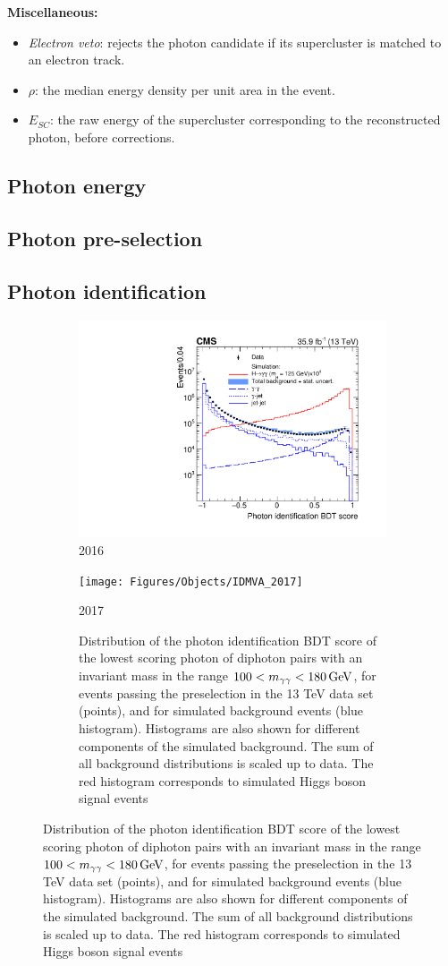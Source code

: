 \textbf{Miscellaneous:}
\begin{itemize}[noitemsep]
\item \emph{Electron veto}: rejects the photon candidate if its 
         supercluster is matched to an electron track.
\item \emph{$\rho$}: the median energy  density per unit area in the event.
\item \emph{$E_{SC}$}: the raw energy of the supercluster
  corresponding to the reconstructed photon, before corrections.
\end{itemize}

\subsection{Photon energy}
\subsection{Photon pre-selection}
\subsection{Photon identification}

\begin{figure}[h!]
  \centering
  \begin{subfigure}{0.45\textwidth}
    \includegraphics[width=\textwidth]{Figures/Objects/IDMVA_2016}
    \caption{2016}
    \label{fig:obj_IDMVA_2016}
  \end{subfigure}
  \begin{subfigure}{0.45\textwidth}
    \texttt{[image: Figures/Objects/IDMVA\_2017]}
    \caption{2017}
    \label{fig:obj_IDMVA_2016}
  \caption{Distribution of the photon identification BDT score of the lowest scoring photon
  of diphoton pairs with an invariant mass in the range $100 < m_{\gamma\gamma} < \SI{180}{GeV}$, for events passing
  the preselection in the 13 TeV data set (points), and for simulated background events (blue
  histogram). Histograms are also shown for different components of the simulated background.
  The sum of all background distributions is scaled up to data. The red histogram corresponds
  to simulated Higgs boson signal events}
  \label{fig:obj_IDMVA}
  \end{subfigure}
\end{figure}

